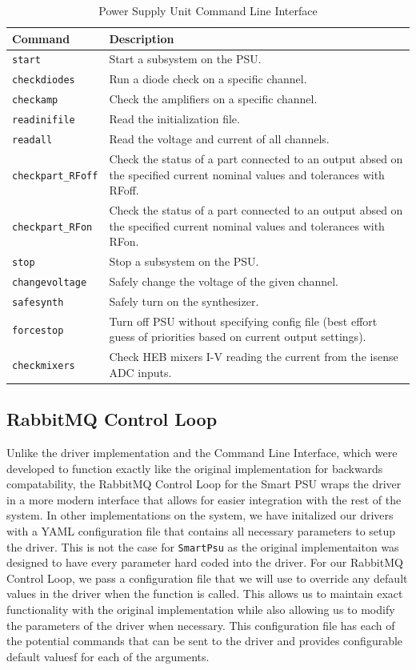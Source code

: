 \begin{table}
    \centering
    \begin{tabularx}{\textwidth}{l|X}
        \textbf{Command} & \textbf{Description} \\
        \hline
        \texttt{start} & Start a subsystem on the PSU. \\
        \texttt{checkdiodes} & Run a diode check on a specific channel. \\
        \texttt{checkamp} & Check the amplifiers on a specific channel. \\
        \texttt{readinifile} & Read the initialization file. \\
        \texttt{readall} & Read the voltage and current of all channels. \\
        \texttt{checkpart\_RFoff} & Check the status of a part connected to an output absed on the specified current nominal values and tolerances with RFoff. \\
        \texttt{checkpart\_RFon} & Check the status of a part connected to an output absed on the specified current nominal values and tolerances with RFon. \\
        \texttt{stop} & Stop a subsystem on the PSU. \\
        \texttt{changevoltage} & Safely change the voltage of the given channel. \\
        \texttt{safesynth} & Safely turn on the synthesizer. \\
        \texttt{forcestop} & Turn off PSU without specifying config file (best effort guess of priorities based on current output settings). \\
        \texttt{checkmixers} & Check HEB mixers I-V reading the current from the isense ADC inputs.
    \end{tabularx}
    \label{chap2/table:psu_cli}
    \caption{Power Supply Unit Command Line Interface}
\end{table}

\subsection{RabbitMQ Control Loop}
Unlike the driver implementation and the Command Line Interface, which were developed to function exactly like the original implementation for backwards compatability, the RabbitMQ Control Loop for the Smart PSU wraps the driver in a more modern interface that allows for easier integration with the rest of the system.
In other implementations on the system, we have initalized our drivers with a YAML configuration file that contains all necessary parameters to setup the driver. 
This is not the case for \texttt{SmartPsu} as the original implementaiton was designed to have every parameter hard coded into the driver.
For our RabbitMQ Control Loop, we pass a configuration file that we will use to override any default values in the driver when the function is called. 
This allows us to maintain exact functionality with the original implementation while also allowing us to modify the parameters of the driver when necessary.
This configuration file has each of the potential commands that can be sent to the driver and provides configurable default valuesf for each of the arguments.

